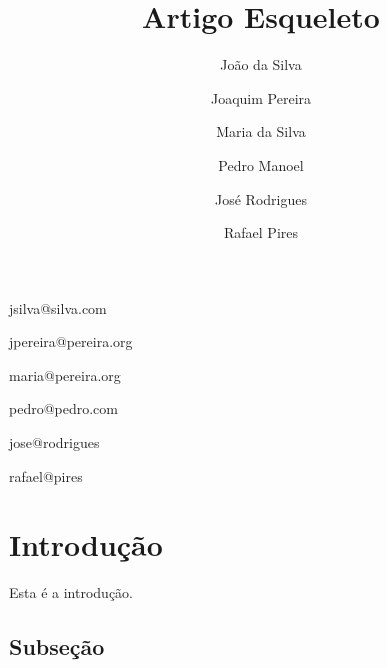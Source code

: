 \documentclass[conference,harvard,brazil,english]{sbatex}
\begin{document}

\title{Artigo Esqueleto}

\author{João da Silva}{jsilva@silva.com}
\address{Endereço do João e da Maria\\ Em algum lugar\\ Cidade, Estado, País}

\author{Joaquim Pereira}{jpereira@pereira.org}
\address{Endereço do Joaquim\\ Em algum lugar\\ Cidade, Estado, País}

\author[1]{Maria da Silva}{maria@pereira.org}

\author{Pedro Manoel}{pedro@pedro.com}
\address{Endereço do Pedro e do Rafael\\ Em algum lugar\\ Cidade, Estado, País}

\author{José Rodrigues}{jose@rodrigues}
\address{Endereço do José\\ Em algum lugar\\ Cidade, Estado, País}

\author[3]{Rafael Pires}{rafael@pires}








\section{Introdução}

	Esta é a introdução.

\subsection{Subseção}
\end{document}
